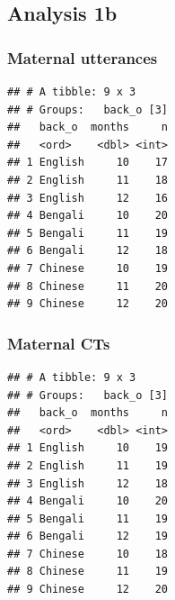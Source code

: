 \documentclass[]{article}
\newenvironment{Shaded}{\begin{snugshade}}{\end{snugshade}}
\newcommand{\DataTypeTok}[1]{\textcolor[rgb]{0.13,0.29,0.53}{#1}}
\newcommand{\KeywordTok}[1]{\textcolor[rgb]{0.13,0.29,0.53}{\textbf{#1}}}
\newcommand{\NormalTok}[1]{#1}
\newcommand{\OperatorTok}[1]{\textcolor[rgb]{0.81,0.36,0.00}{\textbf{#1}}}
\newcommand{\StringTok}[1]{\textcolor[rgb]{0.31,0.60,0.02}{#1}}
\begin{document}
\hypertarget{analysis-1b}{%
\subsection{Analysis 1b}\label{analysis-1b}}

\hypertarget{maternal-utterances-2}{%
\subsubsection{Maternal utterances}\label{maternal-utterances-2}}

\begin{Shaded}
\end{Shaded}

\begin{verbatim}
## # A tibble: 9 x 3
## # Groups:   back_o [3]
##   back_o  months     n
##   <ord>    <dbl> <int>
## 1 English     10    17
## 2 English     11    18
## 3 English     12    16
## 4 Bengali     10    20
## 5 Bengali     11    19
## 6 Bengali     12    18
## 7 Chinese     10    19
## 8 Chinese     11    20
## 9 Chinese     12    20
\end{verbatim}

\hypertarget{maternal-cts}{%
\subsubsection{Maternal CTs}\label{maternal-cts}}

\begin{Shaded}
\end{Shaded}

\begin{verbatim}
## # A tibble: 9 x 3
## # Groups:   back_o [3]
##   back_o  months     n
##   <ord>    <dbl> <int>
## 1 English     10    19
## 2 English     11    19
## 3 English     12    18
## 4 Bengali     10    20
## 5 Bengali     11    19
## 6 Bengali     12    19
## 7 Chinese     10    18
## 8 Chinese     11    19
## 9 Chinese     12    20
\end{verbatim}
\end{document}
